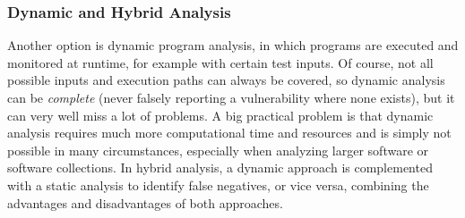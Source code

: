 \documentclass[
	a4paper,
	pagesize,
	pdftex,
	12pt,
	twoside, %
	BCOR=5mm, %
	ngerman,
	fleqn,
	final,
	]{scrartcl}
\begin{document}
\subsubsection{Dynamic and Hybrid Analysis}
Another option is dynamic program analysis, in which programs are executed and monitored at runtime, for example with certain test inputs. Of course, not all possible inputs and execution paths can always be covered, so dynamic analysis can be \textit{complete} (never falsely reporting a vulnerability where none exists), but it can very well miss a lot of problems. A big practical problem is that dynamic analysis requires much more computational time and resources and is simply not possible in many circumstances, especially when analyzing larger software or software collections.
In hybrid analysis, a dynamic approach is complemented with a static analysis to identify false negatives, or vice versa, combining the advantages and disadvantages of both approaches. 
\end{document}
